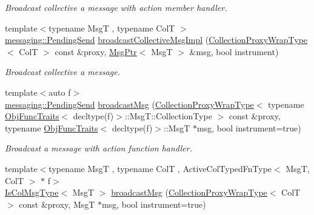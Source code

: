 \begin{DoxyCompactItemize}
\begin{DoxyCompactList}\small\item\em Broadcast collective a message with action member handler. \end{DoxyCompactList}\item 
{\footnotesize template$<$typename MsgT , typename ColT $>$ }\\\hyperlink{structvt_1_1messaging_1_1_pending_send}{messaging\+::\+Pending\+Send} \hyperlink{structvt_1_1vrt_1_1collection_1_1_collection_manager_aae2f8d1ebc378183074c3572894c7ffc}{broadcast\+Collective\+Msg\+Impl} (\hyperlink{structvt_1_1vrt_1_1collection_1_1_collection_manager_a56458ed7f9bb22b631b9b3a745f42f94}{Collection\+Proxy\+Wrap\+Type}$<$ ColT $>$ const \&proxy, \hyperlink{namespacevt_a9f5ebd62ee9d6dd8829e3e1cc4f858e9}{Msg\+Ptr}$<$ MsgT $>$ \&msg, bool instrument)
\begin{DoxyCompactList}\small\item\em Broadcast collective a message. \end{DoxyCompactList}\item 
{\footnotesize template$<$auto f$>$ }\\\hyperlink{structvt_1_1messaging_1_1_pending_send}{messaging\+::\+Pending\+Send} \hyperlink{structvt_1_1vrt_1_1collection_1_1_collection_manager_a3a1d571b26b92b4a8c9a764f765870e9}{broadcast\+Msg} (\hyperlink{structvt_1_1vrt_1_1collection_1_1_collection_manager_a56458ed7f9bb22b631b9b3a745f42f94}{Collection\+Proxy\+Wrap\+Type}$<$ typename \hyperlink{structvt_1_1_obj_func_traits}{Obj\+Func\+Traits}$<$ decltype(f)$>$\+::Msg\+T\+::\+Collection\+Type $>$ const \&proxy, typename \hyperlink{structvt_1_1_obj_func_traits}{Obj\+Func\+Traits}$<$ decltype(f)$>$\+::MsgT $\ast$msg, bool instrument=true)
\begin{DoxyCompactList}\small\item\em Broadcast a message with action function handler. \end{DoxyCompactList}\item 
{\footnotesize template$<$typename MsgT , typename ColT , Active\+Col\+Typed\+Fn\+Type$<$ Msg\+T, Col\+T $>$ $\ast$ f$>$ }\\\hyperlink{structvt_1_1vrt_1_1collection_1_1_collection_manager_a21c21612c806016788057aeab142af20}{Is\+Col\+Msg\+Type}$<$ MsgT $>$ \hyperlink{structvt_1_1vrt_1_1collection_1_1_collection_manager_a2ea2ea93c25a438f0b9b6af390ef0881}{broadcast\+Msg} (\hyperlink{structvt_1_1vrt_1_1collection_1_1_collection_manager_a56458ed7f9bb22b631b9b3a745f42f94}{Collection\+Proxy\+Wrap\+Type}$<$ ColT $>$ const \&proxy, MsgT $\ast$msg, bool instrument=true)

\end{DoxyCompactItemize}
